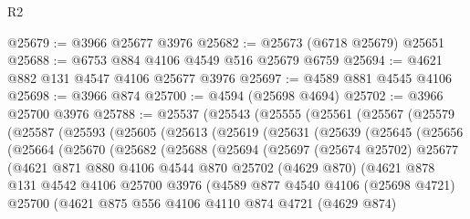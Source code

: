 \begin{lexlean}{R2}
\begin{coremodule}
@25679 := @3966 @25677 @3976
@25682 := @25673 (@6718 @25679) @25651
@25688 := @6753 @884 @4106 @4549 @516 @25679 @6759
@25694 := @4621 @882 @131 @4547 @4106 @25677 @3976
@25697 := @4589 @881 @4545 @4106
@25698 := @3966 @874
@25700 := @4594 (@25698 @4694)
@25702 := @3966 @25700 @3976
@25788 := @25537
    (@25543
      (@25555
        (@25561
          (@25567
            (@25579
              (@25587
                (@25593
                  (@25605
                    (@25613
                      (@25619
                        (@25631
                          (@25639
                            (@25645
                              (@25656
                                (@25664
                                  (@25670
                                    (@25682
                                      (@25688
                                        (@25694
                                          (@25697
                                            (@25674 @25702)
                                            @25677
                                            (@4621
                                              @871
                                              @880
                                              @4106
                                              @4544
                                              @870
                                              @25702
                                              (@4629 @870)
                                              (@4621
                                                @878
                                                @131
                                                @4542
                                                @4106
                                                @25700
                                                @3976
                                                (@4589
                                                  @877
                                                  @4540
                                                  @4106
                                                  (@25698 @4721)
                                                  @25700
                                                  (@4621
                                                    @875
                                                    @556
                                                    @4106
                                                    @4110
                                                    @874
                                                    @4721
                                                    (@4629 @874)

\end{coremodule}
\end{lexlean}
